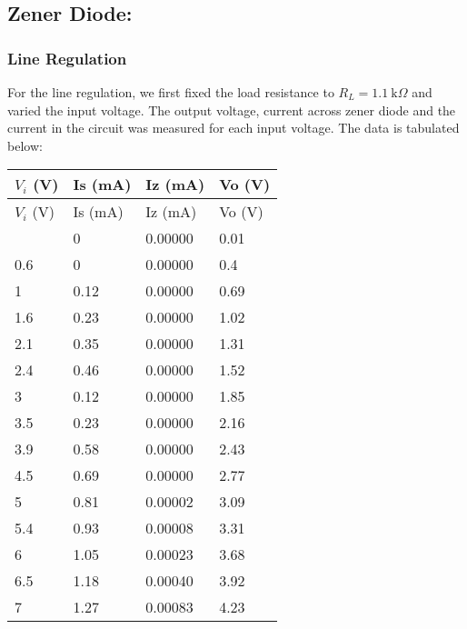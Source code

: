 \documentclass{scrartcl}
\begin{document}
\subsection{Zener Diode:}
\subsubsection{Line Regulation }
For the line regulation, we first fixed the load resistance to $R_L = 1.1 \ \mathrm{k}\Omega$ and varied the input voltage. The output voltage, current across zener diode and the current in the circuit was measured for each input voltage. The data is tabulated below:

\begin{longtable}{|l|l|l|l|}
        \hline
        $V_i$ (V) & Is (mA) & Iz (mA) & Vo (V) \\ \hline
        \endfirsthead
        \hline
        $V_i$ (V) & Is (mA) & Iz (mA) & Vo (V) \\ \hline
        \endhead
        \hline
        \endfoot
        \hline
        \endlastfoot
        0      & 0       & 0.00000       & 0.01    \\ \hline
        0.6    & 0       & 0.00000       & 0.4     \\ \hline
        1      & 0.12    & 0.00000      & 0.69    \\ \hline
        1.6    & 0.23    & 0.00000       & 1.02    \\ \hline
        2.1    & 0.35    & 0.00000      & 1.31    \\ \hline
        2.4    & 0.46    & 0.00000       & 1.52    \\ \hline
        3      & 0.12    & 0.00000       & 1.85    \\ \hline
        3.5    & 0.23    & 0.00000       & 2.16    \\ \hline
        3.9    & 0.58    & 0.00000      & 2.43    \\ \hline
        4.5    & 0.69    & 0.00000       & 2.77    \\ \hline
        5      & 0.81    & 0.00002       & 3.09    \\ \hline
        5.4    & 0.93    & 0.00008       & 3.31    \\ \hline
        6      & 1.05    & 0.00023       & 3.68    \\ \hline
        6.5    & 1.18    & 0.00040       & 3.92    \\ \hline
        7      & 1.27    & 0.00083       & 4.23    \\ \hline

\end{longtable}
\end{document}
